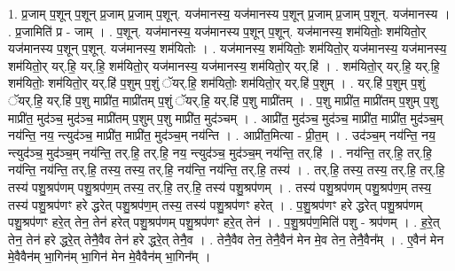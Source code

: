 \documentclass[17pt]{extarticle}
\begin{document}
1. प्र॒जाम् प॒शून् प॒शून् प्र॒जाम् प्र॒जाम् प॒शून्. यज॑मानस्य॒ यज॑मानस्य प॒शून् प्र॒जाम् प्र॒जाम् प॒शून्. यज॑मानस्य । . प्र॒जामिति॑ प्र - जाम् । . प॒शून्. यज॑मानस्य॒ यज॑मानस्य प॒शून् प॒शून्. यज॑मानस्य॒ शम॑यितोः॒ शम॑यितो॒र् यज॑मानस्य प॒शून् प॒शून्. यज॑मानस्य॒ शम॑यितोः । . यज॑मानस्य॒ शम॑यितोः॒ शम॑यितो॒र् यज॑मानस्य॒ यज॑मानस्य॒ शम॑यितो॒र् यर्.हि॒ यर्.हि॒ शम॑यितो॒र् यज॑मानस्य॒ यज॑मानस्य॒ शम॑यितो॒र् यर्.हि॑ । . शम॑यितो॒र् यर्.हि॒ यर्.हि॒ शम॑यितोः॒ शम॑यितो॒र् यर्.हि॑ प॒शुम् प॒शुं ॅयर्.हि॒ शम॑यितोः॒ शम॑यितो॒र् यर्.हि॑ प॒शुम् । . यर्.हि॑ प॒शुम् प॒शुं ॅयर्.हि॒ यर्.हि॑ प॒शु माप्री॑त॒ माप्री॑तम् प॒शुं ॅयर्.हि॒ यर्.हि॑ प॒शु माप्री॑तम् । . प॒शु माप्री॑त॒ माप्री॑तम् प॒शुम् प॒शु माप्री॑त॒ मुद॑ञ्च॒ मुद॑ञ्च॒ माप्री॑तम् प॒शुम् प॒शु माप्री॑त॒ मुद॑ञ्चम् । . आप्री॑त॒ मुद॑ञ्च॒ मुद॑ञ्च॒ माप्री॑त॒ माप्री॑त॒ मुद॑ञ्च॒म् नय॑न्ति॒ नय॒ न्त्युद॑ञ्च॒ माप्री॑त॒ माप्री॑त॒ मुद॑ञ्च॒म् नय॑न्ति । . आप्री॑त॒मित्या - प्री॒त॒म् । . उद॑ञ्च॒म् नय॑न्ति॒ नय॒ न्त्युद॑ञ्च॒ मुद॑ञ्च॒म् नय॑न्ति॒ तर्.हि॒ तर्.हि॒ नय॒ न्त्युद॑ञ्च॒ मुद॑ञ्च॒म् नय॑न्ति॒ तर्.हि॑ । . नय॑न्ति॒ तर्.हि॒ तर्.हि॒ नय॑न्ति॒ नय॑न्ति॒ तर्.हि॒ तस्य॒ तस्य॒ तर्.हि॒ नय॑न्ति॒ नय॑न्ति॒ तर्.हि॒ तस्य॑ । . तर्.हि॒ तस्य॒ तस्य॒ तर्.हि॒ तर्.हि॒ तस्य॑ पशु॒श्रप॑णम् पशु॒श्रप॑ण॒म् तस्य॒ तर्.हि॒ तर्.हि॒ तस्य॑ पशु॒श्रप॑णम् । . तस्य॑ पशु॒श्रप॑णम् पशु॒श्रप॑ण॒म् तस्य॒ तस्य॑ पशु॒श्रप॑णꣳ हरे द्धरेत् पशु॒श्रप॑ण॒म् तस्य॒ तस्य॑ पशु॒श्रप॑णꣳ हरेत् । . प॒शु॒श्रप॑णꣳ हरे द्धरेत् पशु॒श्रप॑णम् पशु॒श्रप॑णꣳ हरे॒त् तेन॒ तेन॑ हरेत् पशु॒श्रप॑णम् पशु॒श्रप॑णꣳ हरे॒त् तेन॑ । . प॒शु॒श्रप॑ण॒मिति॑ पशु - श्रप॑णम् । . ह॒रे॒त् तेन॒ तेन॑ हरे द्धरे॒त् तेनै॒वैव तेन॑ हरे द्धरे॒त् तेनै॒व । . तेनै॒वैव तेन॒ तेनै॒वैन॑ मेन मे॒व तेन॒ तेनै॒वैन᳚म् । . ए॒वैन॑ मेन मे॒वैवैन॑म् भा॒गिन॑म् भा॒गिन॑ मेन मे॒वैवैन॑म् भा॒गिन᳚म् । \newline
\end{document}
